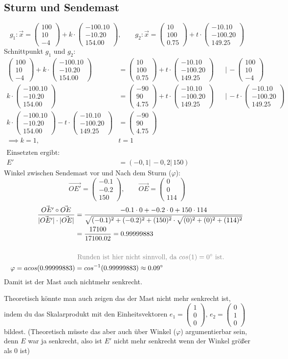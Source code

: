 \documentclass[a4paper,12pt]{article}
\newcommand{\Hinweis}[1]{
	\vspace*{0.3cm}
	\begin{tcolorbox}[breakable,colback=yellow!10,colframe=yellow!65!black,title=\textbf{Hinweis:},width=\linewidth ]
		{#1}
	\end{tcolorbox}
}
\newcommand{\vectr}[3]{\begin{pmatrix}#1\\#2\\#3
\end{pmatrix}}
\begin{document}
\subsection{Sturm und Sendemast}
	\[g_1:\vec{x}=\vectr{100}{10}{-4}+ k \cdot  \vectr{-100.10}{- 10.20}{154.00} ,\qquad g_2:\vec{x}=\vectr{10}{100}{0.75} + t \cdot \vectr{-10.10}{-100.20}{149.25}\]
	Schnittpunkt $g_1$ und $g_2$:
	\begin{align*}
		\vectr{100}{10}{-4}+ k \cdot  \vectr{-100.10}{- 10.20}{154.00} &= \vectr{10}{100}{0.75} + t \cdot \vectr{-10.10}{-100.20}{149.25} && \vert \, -\vectr{100}{10}{-4}\\
	 k \cdot  \vectr{-100.10}{- 10.20}{154.00} &= \vectr{-90}{90}{4.75} + t \cdot \vectr{-10.10}{-100.20}{149.25} && \vert \, - t \cdot \vectr{-10.10}{-100.20}{149.25}\\
	 k \cdot  \vectr{-100.10}{- 10.20}{154.00}- t \cdot \vectr{-10.10}{-100.20}{149.25} &= \vectr{-90}{90}{4.75} && \\
	 \implies k=1, \quad & t=1&&\\\\
	 \text{Einsetzten ergibt:}&&&&\\
	 E' &= ( -0,1 |\, -0,2 |\, 150 )
	\end{align*}
	Winkel zwischen Sendemast vor und Nach dem Sturm ($\varphi$):
	\[\vec{OE'}=\vectr{-0.1}{-0.2}{150} ,\qquad \vec{OE}=\vectr{0}{0}{114} \] 
	\begin{align*}
		\frac{\vec{OE'} \circ \vec{OE} }{|\vec{OE'}| \cdot |\vec{OE}|}&= \frac{-0.1 \cdot 0 + -0.2 \cdot 0 + 150 \cdot 114}{\sqrt{(-0.1)^2+(-0.2)^2+(150)^2}\cdot \sqrt{(0)^2+(0)^2+(114)^2}}\\
		&=\frac{17100}{17100.02}=0.99999883\\\\
		 &\color{gray}\text{ Runden ist hier nicht sinnvoll, da } cos(1)=0^\circ \text{ ist.}\color{black} \\
		\varphi = acos(0.99999883) &= cos^{-1}(0.99999883) \approx 0.09^\circ 
	\end{align*}
	Damit ist der Mast auch nichtmehr senkrecht.
	\Hinweis{Theoretisch könnte man auch zeigen das der Mast nicht mehr senkrecht ist, indem du das Skalarprodukt mit den Einheitsvektoren $e_1=\vectr{1}{0}{0},\, e_2=\vectr{0}{1}{0}$ bildest. (Theoretisch müsste das aber auch über Winkel ($\varphi$) argumentierbar sein, denn $E$ war ja senkrecht, also ist $E'$ nicht mehr senkrecht wenn der Winkel größer als $0$ ist)}
\end{document}
